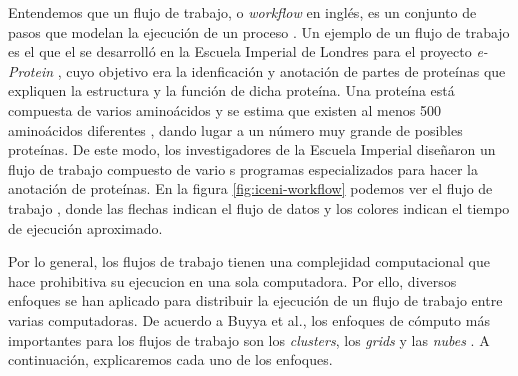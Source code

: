 \documentclass[letterpaper]{report}
\begin{document}
Entendemos que un flujo de trabajo, o \emph{workflow} en inglés, es un conjunto de pasos que modelan la ejecución de un proceso \cite{gutierrez2012agent}. Un ejemplo de un flujo de trabajo es el que el se desarrolló en la Escuela Imperial de Londres para el proyecto \emph{e-Protein} \cite{o2004mapping}, cuyo objetivo era la idenficación y anotación de partes de proteínas que expliquen la estructura y la función de dicha proteína. Una proteína está compuesta de varios aminoácidos y se estima que existen al menos 500 aminoácidos diferentes \cite{wagner1983new}, dando lugar a un número muy grande de posibles proteínas. De este modo, los investigadores de la Escuela Imperial diseñaron un flujo de trabajo compuesto de vario	s programas especializados para hacer la anotación de proteínas. En la figura \ref{fig:iceni-workflow} podemos ver el flujo de trabajo \cite{o2004mapping}, donde las flechas indican el flujo de datos y los colores indican el tiempo de ejecución aproximado.

Por lo general, los flujos de trabajo tienen una complejidad computacional que hace prohibitiva su ejecucion en una sola computadora. Por ello, diversos enfoques se han aplicado para distribuir la ejecución de un flujo de trabajo entre varias computadoras.  De acuerdo a Buyya et al., los enfoques de cómputo más importantes para los flujos de trabajo son los \emph{clusters}, los \emph{grids} y las \emph{nubes} \cite{buyya2009cloud}. A continuación, explicaremos cada uno de los enfoques.
\end{document}
